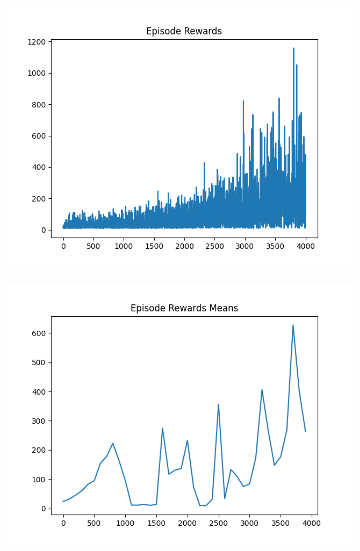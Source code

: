 \begin{figure}[H]
\begin{subfigure}{.47\linewidth}
        \includegraphics[width=\textwidth]{pole/2024-06-13_23-08-40_dqn_cartpole_episode_rewards.png}
    \end{subfigure}
    \begin{subfigure}{.47\linewidth}
        \centering
        \includegraphics[width=\textwidth]{pole/2024-06-14_13-24-09_dqn_cartpole_episode_rewards_means.png}
    \end{subfigure}
\end{figure}
